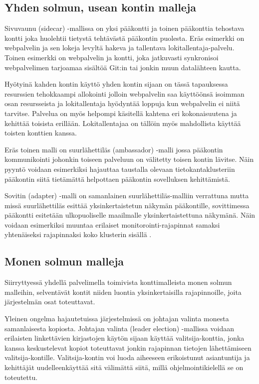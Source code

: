 \documentclass[finnish]{tktltiki2}
\theoremstyle{definition}
\theoremstyle{remark}
\begin{document}
\subsection{Yhden solmun, usean kontin malleja}

Sivuvaunu (sidecar) -mallissa on yksi pääkontti ja toinen pääkonttia tehostava kontti joka huolehtii tietystä tehtävästä pääkontin puolesta. Eräs esimerkki on webpalvelin ja sen lokeja levyltä hakeva ja tallentava lokitallentaja-palvelu. Toinen esimerkki on webpalvelin ja kontti, joka jatkuvasti synkronisoi webpalvelimen tarjoamaa sisältöä Git:in tai jonkin muun datalähteen kautta.

Hyötyinä kahden kontin käyttö yhden kontin sijaan on tässä tapauksessa resurssien tehokkaampi allokointi jolloin webpalvelin saa käyttöönsä isoimman osan resursseista ja lokitallentaja hyödyntää loppuja kun webpalvelin ei niitä tarvitse. Palvelua on myös helpompi käsitellä kahtena eri kokonaisuutena ja kehittää toisista erillään. Lokitallentajaa on tällöin myös mahdollista käyttää toisten konttien kanssa.

Eräs toinen malli on suurlähettiläs (ambassador) -malli jossa pääkontin kommunikointi johonkin toiseen palveluun on välitetty toisen kontin lävitse. Näin pyyntö voidaan esimerkiksi hajauttaa taustalla olevaan tietokantaklusteriin pääkontin siitä tietämättä helpottaen pääkontin sovelluksen kehittämistä.

Sovitin (adapter) -malli on samanlainen suurlähettiläs-malliin verrattuna mutta missä suurlähettiläs esittää yksinkertaistetun näkymän pääkontille, sovittimessa pääkontti esitetään ulkopuoliselle maailmalle yksinkertaistettuna näkymänä. Näin voidaan esimerkiksi muuntaa erilaiset monitorointi-rajapinnat samaksi yhtenäiseksi rajapinnaksi koko klusterin sisällä \cite{container-design-patterns}.

\subsection{Monen solmun malleja}

Siirryttyessä yhdellä palvelimella toimivista konttimalleista monen solmun malleihin, selventävät kontit niiden luontia yksinkertaisilla rajapinnoille, joita järjestelmän osat toteuttavat.

Yleinen ongelma hajautetuissa järjestelmissä on johtajan valinta monesta samanlaisesta kopiosta. Johtajan valinta (leader election) -mallissa voidaan erilaisten linkettävien kirjastojen käytön sijaan käyttää valitsija-konttia, jonka kanssa keskustelevat kopiot toteuttavat jonkin rajapinnan tietojen lähettämiseen valitsija-kontille. Valitsija-kontin voi luoda aiheeseen erikoistunut asiantuntija ja kehittäjät uudelleenkäyttää sitä välimättä siitä, millä ohjelmointikielellä se on toteutettu.
\end{document}
